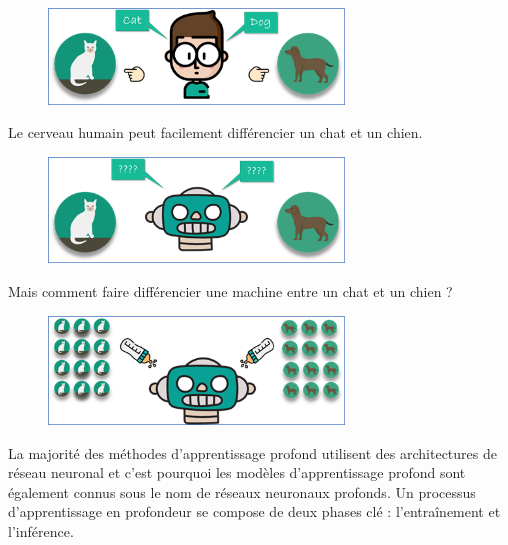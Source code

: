 \documentclass[oneside,13pt,a4paper]{report}
\begin{document}
\begin{figure}[!h]
	\begin{center}
		 \includegraphics[width=0.7\textwidth]{img/intro1.png}
		 \caption{}
	\end{center}
\end{figure}

Le cerveau humain peut facilement différencier un chat et un chien.

\begin{figure}[!h]
	\begin{center}
		 \includegraphics[width=0.7\textwidth]{img/intro2.png}
		 \caption{}
	\end{center}
\end{figure}

Mais comment faire différencier une machine entre un chat et un chien ?
\begin{figure}[!h]
	\begin{center}
		 \includegraphics[width=0.7\textwidth]{img/intro3.png}
		 \caption{}
	\end{center}
\end{figure}

La majorité des méthodes d'apprentissage profond utilisent des architectures de réseau neuronal et c'est pourquoi les modèles d'apprentissage profond sont également connus sous le nom de réseaux neuronaux profonds.
Un processus d'apprentissage en profondeur se compose de deux phases clé : l’entraînement et l'inférence.
\end{document}

